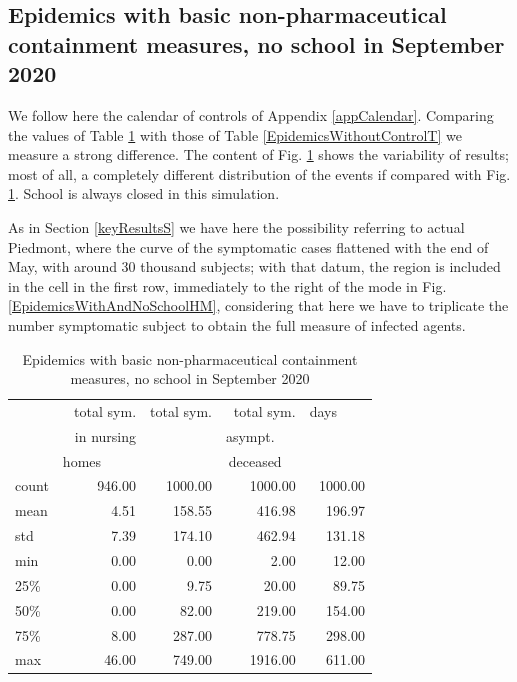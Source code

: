 \documentclass[11pt]{article}
\begin{document}
\subsection{Epidemics with basic non-pharmaceutical containment measures, no school in September 2020}
\label{EpidemicsWithAndNoSchoolS}

We follow here the calendar of controls of Appendix \ref{appCalendar}. Comparing the values of Table \ref{EpidemicsWithAndNoSchoolT} with those of Table \ref{EpidemicsWithoutControlT} we measure a strong difference. The content of Fig. \ref{EpidemicsWithAndNoSchoolT} shows the variability of results; most of all, a completely different distribution of the events if compared with Fig. \ref{EpidemicsWithAndNoSchoolT}. School is always closed in this simulation.

As in Section \ref{keyResultsS} we have here the possibility referring to actual Piedmont, where the curve of the symptomatic cases flattened with the end of May, with around 30 thousand subjects; with that datum, the region is included in the cell in the first row, immediately to the right of the mode in Fig. \ref{EpidemicsWithAndNoSchoolHM}, considering that here we have to triplicate the number symptomatic subject to obtain the full measure of infected agents.


\begin{table}[H]
\center
\small
\begin{tabular}{lrrrr}
\toprule
{} & total sym.        &  total sym. & total sym.     & days~~~~ \\
{} & in nursing        &                  & asympt.~~~  & \\
{} & homes~~~~~  &                  & deceased~~ & \\
\midrule
count &     946.00 &             1000.00 &                 1000.00 & 1000.00 \\
mean  &       4.51 &              158.55 &                  416.98 &  196.97 \\
std   &       7.39 &              174.10 &                  462.94 &  131.18 \\
min   &       0.00 &                0.00 &                    2.00 &   12.00 \\
25\%   &       0.00 &                9.75 &                   20.00 &   89.75 \\
50\%   &       0.00 &               82.00 &                  219.00 &  154.00 \\
75\%   &       8.00 &              287.00 &                  778.75 &  298.00 \\
max   &      46.00 &              749.00 &                 1916.00 &  611.00 \\
\bottomrule
\end{tabular}

\label{EpidemicsWithAndNoSchoolT}
\caption{Epidemics with basic non-pharmaceutical containment measures, no school in September 2020}
\end{table}
\end{document}
